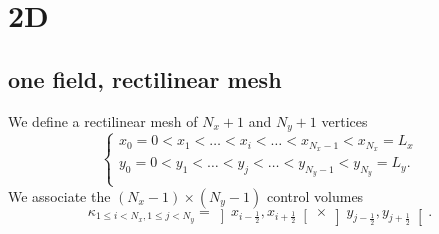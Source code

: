 \documentclass[aps,onecolumn]{revtex4}
\newcommand{\half}{\frac{1}{2}}
\begin{document}
\section{2D}
\subsection{one field, rectilinear mesh}
We define a rectilinear mesh of $N_x+1$ and $N_y+1$ vertices
\begin{equation}
\left\lbrace
\begin{array}{l}
x_0=0<x_1<\ldots<x_i<\ldots<x_{N_x-1}<x_{N_x}=L_x\\
y_0=0<y_1<\ldots<y_j<\ldots<y_{N_y-1}<y_{N_y}=L_y.\\
\end{array}
\right.
\end{equation}
We associate the $(N_x-1)\times(N_y-1)$ control volumes
\begin{equation}
	\kappa_{1\leq i < N_x,1\leq j < N_y } =  \left\rbrack x_{i-\half}, x_{i+\half}\right\lbrack \times \left\rbrack y_{j-\half}, y_{j+\half}\right\lbrack.
\end{equation}
\end{document}
